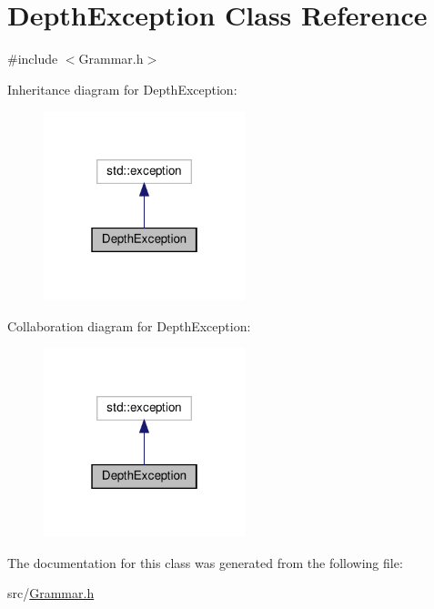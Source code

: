 \hypertarget{class_depth_exception}{}\section{Depth\+Exception Class Reference}
\label{class_depth_exception}


{\ttfamily \#include $<$Grammar.\+h$>$}



Inheritance diagram for Depth\+Exception\+:\nopagebreak
\begin{figure}[H]
\begin{center}
\leavevmode
\includegraphics[width=166pt]{class_depth_exception__inherit__graph}
\end{center}
\end{figure}


Collaboration diagram for Depth\+Exception\+:\nopagebreak
\begin{figure}[H]
\begin{center}
\leavevmode
\includegraphics[width=166pt]{class_depth_exception__coll__graph}
\end{center}
\end{figure}


The documentation for this class was generated from the following file\+:\begin{DoxyCompactItemize}
\item 
src/\hyperlink{_grammar_8h}{Grammar.\+h}\end{DoxyCompactItemize}
